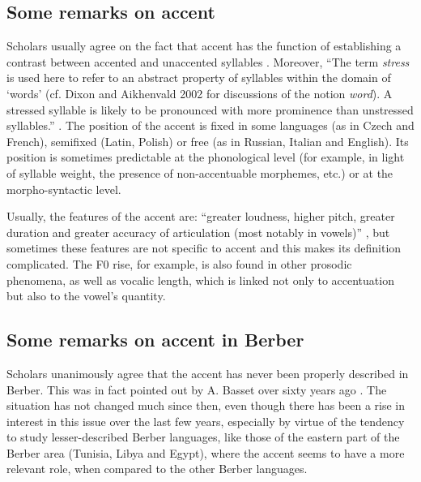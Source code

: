 \documentclass[output=paper]{langsci/langscibook}
\begin{document}
\subsection{Some remarks on accent}\label{5sec:11}
\largerpage
Scholars usually agree on the fact that accent has the function of establishing a contrast between accented and unaccented syllables \citep[][50]{garde:68}. Moreover, ``The term {\emph{stress}} is used here to refer to an abstract property of syllables within the domain of `words' (cf. Dixon and Aikhenvald 2002 for discussions of the notion {\emph{word}}). A stressed syllable is likely to be pronounced with more prominence than unstressed syllables.'' \citep[][Section 1]{goedemans:vanderhulst:13}. The position of the accent is fixed in some languages (as in Czech and French), semifixed (Latin, Polish) or free (as in Russian, Italian and English). Its position is sometimes predictable at the phonological level (for example, in light of syllable weight, the presence of non-accentuable morphemes, etc.) or at the morpho-syntactic level.

Usually, the features of the accent are: ``greater loudness, higher pitch, greater duration and greater accuracy of articulation (most notably in vowels)'' \citep[][Section 1]{goedemans:vanderhulst:13}, but sometimes these features are not specific to accent and this makes its definition complicated. The F0 rise, for example, is also found in other prosodic phenomena, as well as vocalic length, which is linked not only to accentuation but also to the vowel's quantity.


\subsection{Some remarks on accent in Berber}\label{5sec:12}

Scholars unanimously agree that the accent has never been properly described in Berber. This was in fact pointed out by A. Basset over sixty years ago \citep[][10]{basset:52}. The situation has not changed much since then, even though there has been a rise in interest in this issue over the last few years, especially by virtue of the tendency to study lesser-described Berber languages, like those of the eastern part of the Berber area (Tunisia, Libya and Egypt), where the accent seems to have a more relevant role, when compared to the other Berber languages.
\end{document}
